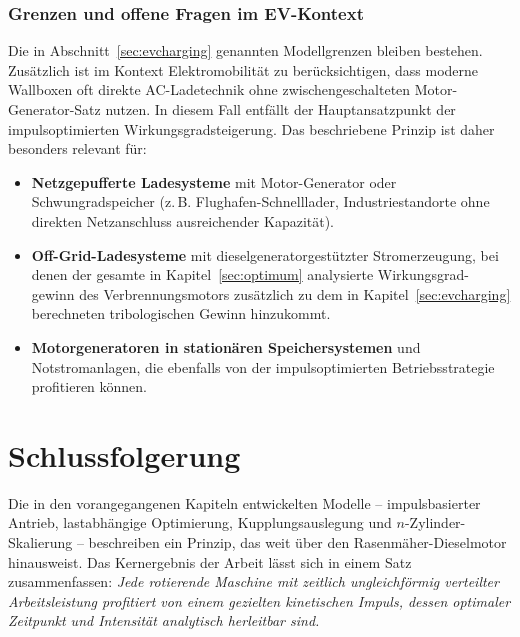 ﻿\documentclass[a4paper,12pt]{article}
\begin{document}
\subsubsection*{Grenzen und offene Fragen im EV-Kontext}

Die in Abschnitt~\ref{sec:evcharging} genannten Modellgrenzen bleiben bestehen.
Zusätzlich ist im Kontext Elektromobilität zu berücksichtigen, dass moderne
Wallboxen oft direkte AC-Ladetechnik ohne zwischengeschalteten Motor-Generator-Satz
nutzen. In diesem Fall entfällt der Hauptansatzpunkt der impulsoptimierten
Wirkungsgradsteigerung. Das beschriebene Prinzip ist daher besonders relevant
für:

\begin{itemize}
  \item \textbf{Netzgepufferte Ladesysteme} mit Motor-Generator oder Schwungradspeicher
    (z.\,B. Flughafen-Schnelllader, Industriestandorte ohne direkten Netzanschluss
    ausreichender Kapazität).
  \item \textbf{Off-Grid-Ladesysteme} mit dieselgeneratorgestützter Stromerzeugung,
    bei denen der gesamte in Kapitel~\ref{sec:optimum} analysierte Wirkungsgrad-
    gewinn des Verbrennungsmotors zusätzlich zu dem in Kapitel~\ref{sec:evcharging}
    berechneten tribologischen Gewinn hinzukommt.
  \item \textbf{Motorgeneratoren in stationären Speichersystemen} und
    Notstromanlagen, die ebenfalls von der impulsoptimierten Betriebsstrategie
    profitieren können.
\end{itemize}

\section{Schlussfolgerung}
\label{sec:schluss}

Die in den vorangegangenen Kapiteln entwickelten Modelle -- impulsbasierter
Antrieb, lastabhängige Optimierung, Kupplungsauslegung und $n$-Zylinder-Skalierung
-- beschreiben ein Prinzip, das weit über den Rasenmäher-Dieselmotor hinausweist.
Das Kernergebnis der Arbeit lässt sich in einem Satz zusammenfassen: \textit{Jede
	rotierende Maschine mit zeitlich ungleichförmig verteilter Arbeitsleistung
	profitiert von einem gezielten kinetischen Impuls, dessen optimaler Zeitpunkt
	und Intensität analytisch herleitbar sind.}
\end{document}
